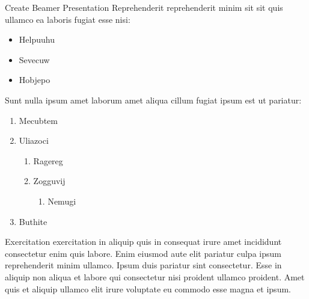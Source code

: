 \documentclass{beamer}
\begin{document}
\begin{frame}{Create Beamer Presentation}
  Reprehenderit reprehenderit minim sit sit quis ullamco ea laboris fugiat esse nisi:
  \begin{itemize}
    \item Helpuuhu
    \item Sevecuw
    \item Hobjepo
  \end{itemize}

  Sunt nulla ipsum amet laborum amet aliqua cillum fugiat ipsum est ut pariatur:
  \begin{enumerate}
    \item Mecubtem
    \item Uliazoci
          \begin{enumerate}
            \item Ragereg
            \item Zogguvij
                  \begin{enumerate}
                    \item Nemugi
                  \end{enumerate}
          \end{enumerate}
    \item Buthite
  \end{enumerate}
\end{frame}

\begin{frame}
  Exercitation exercitation in aliquip quis in consequat irure amet incididunt consectetur enim quis labore. Enim eiusmod aute elit pariatur culpa ipsum reprehenderit minim ullamco. Ipsum duis pariatur sint consectetur. Esse in aliquip non aliqua et labore qui consectetur nisi proident ullamco proident. Amet quis et aliquip ullamco elit irure voluptate eu commodo esse magna et ipsum.
\end{frame}
\end{document}
